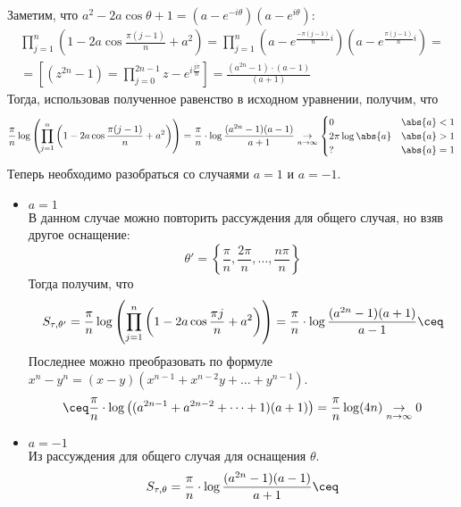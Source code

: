 \begin{example}
\begin{enumerate}
    Заметим, что $a ^ 2 - 2a \cos{\theta} + 1 = (a - e ^ {-i \theta})(a - e ^ {i \theta})$:
    \[
        \begin{gathered}
            \prod_{j = 1}^n \left(1 - 2a \cos{\frac{\pi (j - 1)}{n} + a ^ 2}\right)=
            \prod_{j = 1}^n \left(a - e ^ {\frac{-\pi (j - 1)}{n} i }\right)\left(a - e ^ {\frac{\pi (j - 1)}{n} i }\right)=\\
            =\left[(z^{2n} - 1) = \prod\limits_{j=0}^{2n - 1 }{z - e^{i\frac{j \pi}{n}}}\right]=
            \frac{(a ^ {2n} - 1) \cdot (a - 1)}{(a + 1)} 
        \end{gathered}
    \]
    Тогда, использовав полученное равенство в исходном уравнении, получим, что 
    \[
        \frac{\pi}{n} \log\left(\prod_{j = 1}^n \left(1 - 2a \cos{\frac{\pi (j - 1)}{n} + a ^ 2}\right)\right)=
        \frac{\pi}{n} \cdot \log{\frac{(a ^ {2n} - 1)(a - 1)}{a + 1}} \underset{n \to \infty}{\to}
        \begin{cases}
            0 & \abs{a} < 1 \\
            2 \pi \log{\abs{a}} & \abs{a} > 1 \\
            ? & \abs{a} = 1
        \end{cases}
    \]
    Теперь необходимо разобраться со случаями $a = 1$ и $a = -1$.
    \begin{itemize}
        \item $a = 1$\\
            В данном случае можно повторить рассуждения для общего случая, но взяв другое оснащение: 
            \[
                \theta' = \left\{\frac{\pi}{n}, \frac{2\pi}{n}, \dots, \frac{n\pi}{n}\right\}
            \] 
            Тогда получим, что 
            \[
                S_{\tau, \theta'} = \frac{\pi}{n} \log\left(\prod_{j = 1}^n \left(1 - 2a \cos{\frac{\pi j}{n} + a ^ 2}\right)\right)=
                \frac{\pi}{n} \cdot \log{\frac{(a ^ {2n} - 1)(a + 1)}{a - 1}} \ceq\\
            \] 
            Последнее можно преобразовать по формуле $x^n - y^n = (x - y)(x^{n - 1} + x^{n - 2}y + \dots + y^{n - 1})$.
            \[
                \ceq \frac{\pi}{n}\cdot \log\left((a^{2n - 1}+a^{2n - 2} + \dots + 1)(a + 1)\right) = 
                \frac{\pi}{n}\log(4n) \underset{n\to\infty}{\to} 0
            \] 
        \item $a = -1$\\
            Из рассуждения для общего случая для оснащения $\theta$.
            \[
                S_{\tau,\theta} = \frac{\pi}{n} \cdot \log{\frac{(a ^ {2n} - 1)(a - 1)}{a + 1}} \ceq
\]
\end{itemize}
\end{enumerate}
\end{example}
